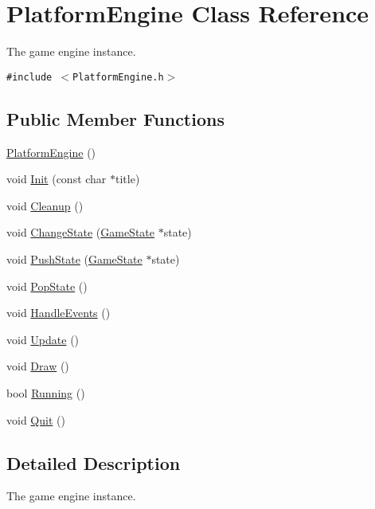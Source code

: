 \hypertarget{class_platform_engine}{
\section{PlatformEngine Class Reference}
\label{class_platform_engine}
}
The game engine instance.  


{\tt \#include $<$PlatformEngine.h$>$}

\subsection*{Public Member Functions}
\begin{CompactItemize}
\item 
\hyperlink{class_platform_engine_9d45e2da5a9b7e52d8c5636f70068e11}{PlatformEngine} ()
\item 
void \hyperlink{class_platform_engine_31d40c1f435565850964c6e9f212baa5}{Init} (const char $\ast$title)
\item 
void \hyperlink{class_platform_engine_361b54312d9ec2fa842cd982f67100f9}{Cleanup} ()
\item 
void \hyperlink{class_platform_engine_d2b335545c9ab6bce7be7c014bc8c528}{ChangeState} (\hyperlink{class_game_state}{GameState} $\ast$state)
\item 
void \hyperlink{class_platform_engine_98e3d34b6ee831bcc1d26bac83bfe8d8}{PushState} (\hyperlink{class_game_state}{GameState} $\ast$state)
\item 
void \hyperlink{class_platform_engine_cf001abec596906465197d1220db2230}{PopState} ()
\item 
void \hyperlink{class_platform_engine_7fc47bff353292f1a1435d78664df36d}{HandleEvents} ()
\item 
void \hyperlink{class_platform_engine_d3ab75304226ad3fcac6b66ce3cedbc7}{Update} ()
\item 
void \hyperlink{class_platform_engine_cd756d58f81c5e28efe98ae075367a5c}{Draw} ()
\item 
bool \hyperlink{class_platform_engine_31ec37c0222f4694cc3c0e819e143038}{Running} ()
\item 
void \hyperlink{class_platform_engine_dbcdd91813cabbe51bb2f86eb23e772a}{Quit} ()
\end{CompactItemize}


\subsection{Detailed Description}
The game engine instance. 

